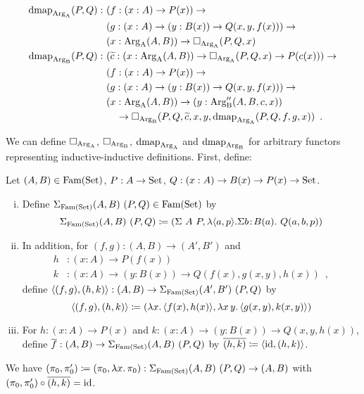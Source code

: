 \documentclass[orivec,envcountsame, ,envcountsect]{llncs}
\begin{document}
\begin{align*}
  \dmap_{\ArgA}(P, Q) :\ & (f : (x : A) \to P(x)) \to \\
                 & (g : (x : A) \to (y : B(x)) \to Q(x, y, f(x))) \to \\
                 & (x : \ArgA(A, B)) \to \BOX_{\ArgA}(P, Q, x) \\
%
  \dmap_{\ArgB}(P, Q) :\ &(\stepind{c} : (x : \ArgA(A, B)) \to \BOX_{\ArgA}(P, Q, x) \to P(c(x))) \to \\
                 & (f : (x : A) \to P(x)) \to \\
                 & (g : (x : A) \to (y : B(x)) \to Q(x, y, f(x))) \to \\
                 & (x : \ArgA(A, B)) \to (y : \ArgB''(A, B, c, x)) \\ 
                 & \quad \to \BOX_{\ArgB}(P, Q, \stepind{c}, x, y, \dmap_{\ArgA}(P, Q, f, g, x)) \enspace .
\end{align*}

We can define $\Box_{\text{Arg}_{\text{A}}}$, $\Box_{\text{Arg}_{\text{B}}}$, $\text{dmap}_{\text{Arg}_{\text{A}}}$ and $\text{dmap}_{\text{Arg}_{\text{B}}}$ for arbitrary functors
representing inductive-inductive definitions. First, define:

\begin{definition}
    Let $(A, B) \in \text{Fam}(\text{Set})$, $P : A \to \text{Set}$, $Q : (x : A) \to B(x)
    \to P(x) \to \text{Set}$.
  \begin{enumerate}[(i)]
  \item Define $\Sigma_{\text{Fam}(\text{Set})} (A, B)\ (P, Q) \in \text{Fam}(\text{Set})$ by
 \[
\Sigma_{\text{Fam}(\text{Set})} (A, B)\ (P, Q) \coloneqq (\Sigma\ A\ P, \lambda
    \langle a, p\rangle . \Sigma b\!:\!B(a).\ Q(a, b, p))
 \]
  \item In addition, for $(f, g) : (A, B) \to (A', B')$ and
  \begin{align*}
h &: (x : A) \to P(f(x)) \\
k &: (x : A) \to (y : B(x)) \to Q(f(x), g(x, y), h(x)) \enspace ,
  \end{align*}
define $\langle(f, g), (h, k)\rangle : (A, B) \to \Sigma_{\text{Fam}(\text{Set})} (A', B')\ (P, Q)$ by
\[
\langle(f, g), (h, k)\rangle \coloneqq (\lambda x .\, \langle f(x), h(x)\rangle, \lambda x\,y .\, \langle g(x, y), k(x, y)\rangle)
\]
\item For $h : (x : A) \to P(x)$ and $ k : (x : A) \to (y : B(x)) \to
  Q(x, y, h(x))$, define $\overline{f} : (A, B) \to \Sigma_{\text{Fam}(\text{Set})} (A, B)\
  (P, Q)$ by $\overline{(h, k)} \coloneqq \langle\text{id}, (h, k)\rangle$.
  \end{enumerate}
\end{definition}
We have $(\pi_0, \pi'_0) \coloneqq (\pi_0, \lambda x .\,
\pi_0) : \Sigma_{\text{Fam}(\text{Set})} (A, B)\ (P, Q) \to (A, B)$ with $(\pi_0, \pi'_0)
\circ \overline{(h, k)} = \text{id}$.
\end{document}

